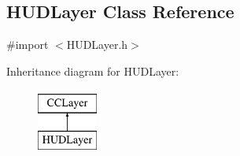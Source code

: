 \hypertarget{interface_h_u_d_layer}{\subsection{H\-U\-D\-Layer Class Reference}
\label{d3/d8a/interface_h_u_d_layer}
}


{\ttfamily \#import $<$H\-U\-D\-Layer.\-h$>$}

Inheritance diagram for H\-U\-D\-Layer\-:\begin{figure}[H]
\begin{center}
\leavevmode
\includegraphics[height=2.000000cm]{d3/d8a/interface_h_u_d_layer}
\end{center}
\end{figure}

